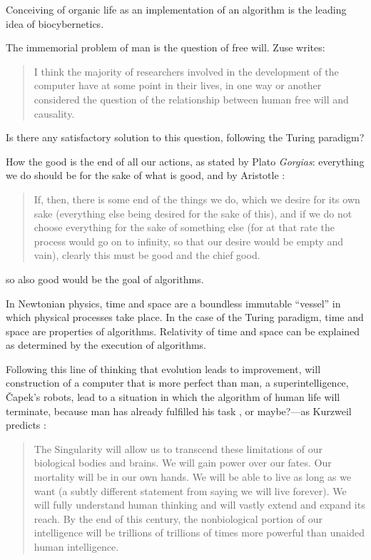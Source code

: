 \documentclass[pdftex,12pt]{article}
\begin{document}
Conceiving of organic life as an implementation of an algorithm is the leading idea of biocybernetics.


The immemorial problem of man is the question of free will. Zuse \parencite[p.62--63]{German2012} writes: \begin{quote} \small I think the majority of researchers involved in the development of the computer have at some point in their lives, in one way or another considered the question of the relationship between human free will and causality. \end{quote} Is there any satisfactory solution to this question, following the Turing paradigm?


How the good is the end of all our actions, as stated by Plato \emph{Gorgias}:  everything we do should be for the sake of what is good, and by Aristotle \parencite*[I.2]{Aristotle1999}: \begin{quote} \small If, then, there is some end of the things we do, which we desire for its own sake (everything else being desired for the sake of this), and if we do not choose everything for the sake of something else (for at that rate the process would go on to infinity, so that our desire would be empty and vain), clearly this must be good and the chief good. \end{quote} so also good would be the goal of algorithms.


In Newtonian physics, time and space are a boundless immutable ``vessel'' in which physical processes take place. In the case of the Turing paradigm, time and space are properties of algorithms. Relativity of time and space can be explained as determined by the execution of algorithms.


Following this line of thinking that evolution leads to improvement, will construction of  a computer that is more perfect than man,  a superintelligence,  {\v C}apek's robots, lead to a situation in which the algorithm of human life will terminate, because man has already fulfilled his task \parencite{Bostrom2014}, or maybe?---as Kurzweil predicts \parencite*{Kurzweil2005}: \begin{quote} \small The Singularity will allow us to transcend these limitations of our biological bodies and brains. We will gain power over our fates. Our mortality will be in our own hands. We will be able to live as long as we want (a subtly different statement from saying we will live forever). We will fully understand human thinking and will vastly extend and expand its reach. By the end of this century, the nonbiological portion of our intelligence will be trillions of trillions of times more powerful than unaided human intelligence. \end{quote}
\end{document}
